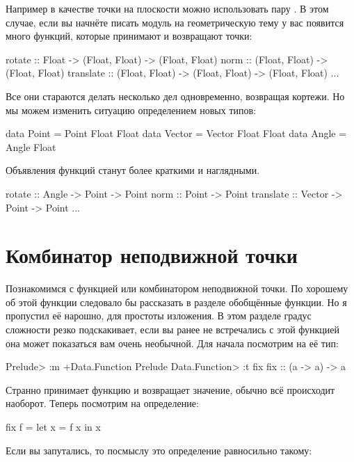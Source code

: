 Например в качестве точки на плоскости можно использовать пару
. В этом случае, если вы начнёте писать модуль на
геометрическую тему у вас появится много функций, которые принимают и
возвращают точки:


\begin{code}
rotate      :: Float -> (Float, Float) -> (Float, Float)
norm        :: (Float, Float) -> (Float, Float)
translate   :: (Float, Float) -> (Float, Float) -> (Float, Float)
...    
\end{code}

Все они стараются делать несколько дел одновременно, возвращая кортежи.
Но мы можем изменить ситуацию определением новых типов:


\begin{code}
data Point  = Point  Float Float
data Vector = Vector Float Float
data Angle  = Angle  Float
\end{code}

Объявления функций станут более краткими и наглядными.


\begin{code}
rotate      :: Angle  -> Point -> Point
norm        :: Point  -> Point
translate   :: Vector -> Point -> Point
...    
\end{code}

\section{Комбинатор неподвижной точки}

Познакомимся с функцией  или комбинатором неподвижной точки. По
хорошему об этой функции следовало бы рассказать в разделе обобщённые
функции. Но я пропустил её нарошно, для простоты изложения. В этом
разделе градус сложности резко подскакивает, если вы ранее не
встречались с этой функцией она может показаться вам очень необычной.
Для начала посмотрим на её тип:


\begin{code}
Prelude> :m +Data.Function
Prelude Data.Function> :t fix
fix :: (a -> a) -> a
\end{code}

Странно  принимает функцию и возвращает значение, обычно всё
происходит наоборот. Теперь посмотрим на определение:


\begin{code}
fix f = let x = f x
        in  x
\end{code}

Если вы запутались, то посмыслу это определение равносильно такому:


